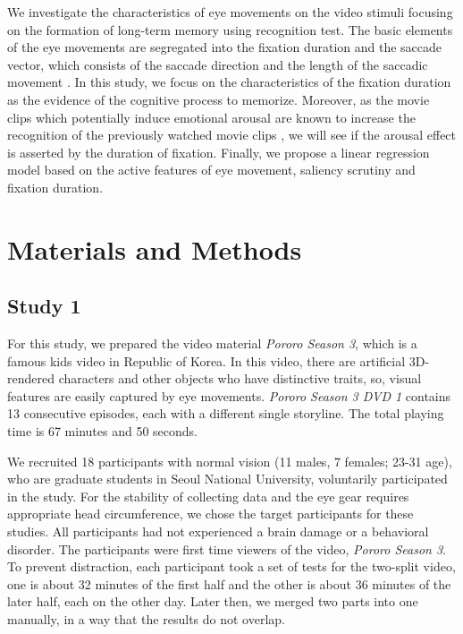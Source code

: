 \documentclass[oneside,master]{snueethesis}
\begin{document}
We investigate the characteristics of eye movements on the video stimuli focusing on the formation of long-term memory using recognition test. The basic elements of the eye movements are segregated into the fixation duration and the saccade vector, which consists of the saccade direction and the length of the saccadic movement \cite{Findlay1999,Feng2006}. In this study, we focus on the characteristics of the fixation duration as the evidence of the cognitive process to memorize. Moreover, as the movie clips which potentially induce emotional arousal are known to increase the recognition of the previously watched movie clips \cite{Cahill1996amyg,Cahill1998baso}, we will see if the arousal effect is asserted by the duration of fixation. Finally, we propose a linear regression model based on the active features of eye movement, saliency scrutiny and fixation duration.



\chapter{Materials and Methods}
\label{sec:material-and-methods}


\section{Study 1}

For this study, we prepared the video material \textit{Pororo Season 3}, which is a famous kids video in Republic of Korea. In this video, there are artificial 3D-rendered characters and other objects who have distinctive traits, so, visual features are easily captured by eye movements. \textit{Pororo Season 3 DVD 1} contains 13 consecutive episodes, each with a different single storyline. The total playing time is 67 minutes and 50 seconds.

We recruited 18 participants with normal vision (11 males, 7 females; 23-31 age), who are graduate students in Seoul National University, voluntarily participated in the study. For the stability of collecting data and the eye gear requires appropriate head circumference, we chose the target participants for these studies. All participants had not experienced a brain damage or a behavioral disorder. The participants were first time viewers of the video, \textit{Pororo Season 3}. To prevent distraction, each participant took a set of tests for the two-split video, one is about 32 minutes of the first half and the other is about 36 minutes of the later half, each on the other day. Later then, we merged two parts into one manually, in a way that the results do not overlap. 
\end{document}
